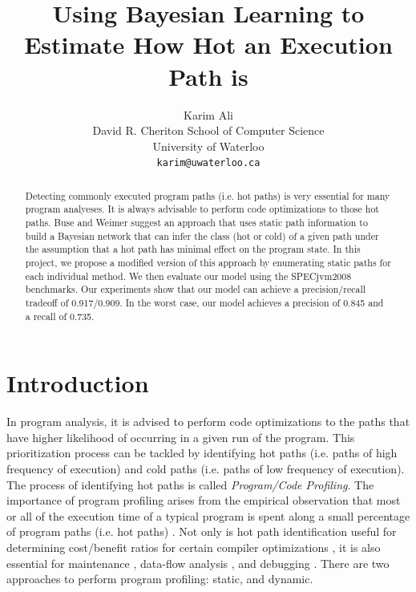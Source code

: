 \documentclass[10pt,twocolumn,letterpaper]{article}
\begin{document}
\title{Using Bayesian Learning to Estimate How Hot an Execution Path is}

\author{Karim Ali\\
David R. Cheriton School of Computer Science\\
University of Waterloo\\
{\tt\small karim@uwaterloo.ca}}

\maketitle
\thispagestyle{empty}

\begin{abstract}
Detecting commonly executed program paths (i.e. hot paths) is very essential for many program analyeses. It is always advisable to perform code optimizations
to those hot paths. Buse and Weimer \cite{buse2009road} suggest an approach that uses static path information to build a Bayesian network that can infer the
class (hot or cold) of a given path under the assumption that a hot path has minimal effect on the program state. In this project, we propose a modified version
of this approach by enumerating static paths for each individual method. We then evaluate our model using the SPECjvm2008 \cite{specjvm2008} benchmarks. Our
experiments show that our model can achieve a precision/recall tradeoff of 0.917/0.909. In the worst case, our model achieves a precision of 0.845 and a recall
of 0.735.
\end{abstract}

\section{Introduction}
\label{sec:intro}
In program analysis, it is advised to perform code optimizations to the paths that have higher likelihood of occurring in a given run of the program. This
prioritization process can be tackled by identifying hot paths (i.e. paths of high frequency of execution) and cold paths (i.e. paths of low frequency of
execution). The process of identifying hot paths is called \textit{Program/Code Profiling}. The importance of program profiling arises from the empirical
observation that most or all of the execution time of a typical program is spent along a small percentage of program paths (i.e. hot paths) \cite{buse2009road}.
Not only is hot path identification useful for determining cost/benefit ratios for certain compiler optimizations \cite{boogerd2008use}, it is also essential
for maintenance \cite{reps1997use}, data-flow analysis \cite{ammons1998improving}, and debugging \cite{chilimbi2009holmes}. There are two approaches to perform
program profiling: static, and dynamic.
\end{document}
